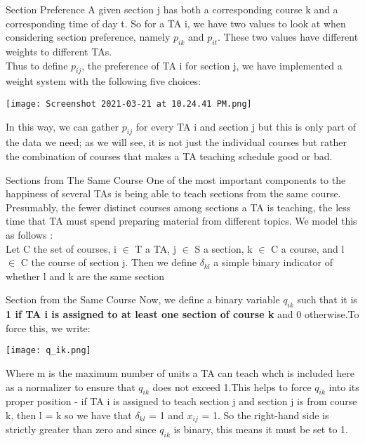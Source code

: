 \documentclass[9pt]{beamer}
\begin{document}
\begin{frame}{Section Preference}
A given section j has both a corresponding course k and a corresponding time of day t. So for a TA i, we have two values to look at when considering section preference, namely $ p_{ik} $ and $ p_{it} $. These two values have different weights to different TAs.\\
\vspace{0.2cm}
\pause
Thus to define $ p_{ij} $, the preference of TA i for section j, we have implemented a weight system with the following five choices:\\
\vspace{0.2cm}
\begin{center}
\texttt{[image: Screenshot 2021-03-21 at 10.24.41 PM.png]}\\
\end{center}
\pause
In this way, we can gather $ p_{ij} $ for every TA i and section j but this is only part of the data we need; as we will see, it is not just the individual courses but rather the combination of courses that makes a TA teaching schedule good or bad.
\end{frame} 

\begin{frame}{Sections from The Same Course}
One of the most important components to the happiness of several TAs is being able to teach sections from the same course. Presumably, the fewer distinct courses among sections a TA is teaching, the less time that TA must spend preparing material from different topics. We model this as follows :\\
\vspace{0.3cm}
\pause
Let C the set of courses, i $ \in $ T a TA, j $ \in $ S a section, k  $ \in $ C a course, and l $ \in $ C the course of section j. Then we define $ \delta_{kl} $ a simple binary indicator of whether l and k are the same section\\
\end{frame}

\begin{frame}{Section from the Same Course}
Now, we define a binary variable $ q_{ik} $ such that it is \textbf{1 if TA i is assigned to at least one section of course k} and 0 otherwise.To force this, we write:\\
\begin{center}
    \texttt{[image: q\_ik.png]}
\end{center}
\pause
Where m is the maximum number of units a TA can teach whch is included here as a normalizer to ensure that $ q_{ik} $ does not exceed 1.This helps to force $ q_{ik} $ into its proper position - if TA i is assigned to teach section j and section j is from course k, then l = k so we have that $ \delta_{kl} $ = 1 and $ x_{ij} $ = 1. So the right-hand side is strictly greater than zero and since $ q_{ik} $ is binary, this means it must be set to 1.\\
\end{frame} 
\end{document}
